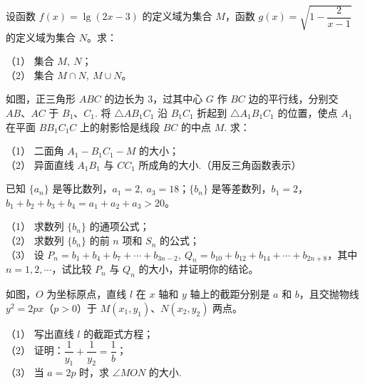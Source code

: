 \begin{question}

设函数 $f(x)=\lg(2x-3)$ 的定义域为集合 $M$，函数 $g(x)=\sqrt{1-\dfrac2{x-1}}$ 的定义域为集合 $N$。求：

（1） 集合 $M,\ N$；\\
（2） 集合 $M\cap N,\ M\cup N$。

\Needspace{0.4\textheight}
\end{question}
\begin{question}

如图，正三角形 $ABC$ 的边长为 $3$，过其中心 $G$ 作 $BC$ 边的平行线，分别交 $AB\text{、}AC$ 于 $B_1\text{、}C_1$. 将 $\triangle AB_1C_1$ 沿 $B_1C_1$ 折起到 $\triangle A_1B_1C_1$ 的位置，使点 $A_1$ 在平面 $BB_1C_1C$ 上的射影恰是线段 $BC$ 的中点 $M$. 求：

（1） 二面角 $A_1-B_1C_1-M$ 的大小；\\
（2） 异面直线 $A_1B_1$ 与 $CC_1$ 所成角的大小.（用反三角函数表示）
\nopagebreak[4]
\begin{center}\end{center}
\nopagebreak[4]
\end{question}
\begin{question}

已知 $\{a_n\}$ 是等比数列，$a_1=2,\ a_3=18$；$\{b_n\}$ 是等差数列，$b_1=2$，$b_1+b_2+b_3+b_4=a_1+a_2+a_3>20$。

（1） 求数列 $\{b_n\}$ 的通项公式；\\
（2） 求数列 $\{b_n\}$ 的前 $n$ 项和 $S_n$ 的公式；\\
（3） 设 $P_n=b_1+b_4+b_7+\cdots+b_{3n-2},\ Q_n=b_{10}+b_{12}+b_{14}+\cdots+b_{2n+8}$，其中 $n=1,2,\cdots$，试比较 $P_n$ 与 $Q_n$ 的大小，并证明你的结论。

\Needspace{0.4\textheight}
\end{question}
\begin{question}

如图，$O$ 为坐标原点，直线 $l$ 在 $x$ 轴和 $y$ 轴上的截距分别是 $a$ 和 $b$，且交抛物线 $y^2=2px$（$p>0$）于 $M(x_1,y_1)\text{、}N(x_2,y_2)$ 两点。

（1） 写出直线 $l$ 的截距式方程；\\
（2） 证明：$\dfrac1{y_1}+\dfrac1{y_2}=\dfrac1b$；\\
（3） 当 $a=2p$ 时，求 $\angle MON$ 的大小.
\nopagebreak[4]
\begin{center}\end{center}
\nopagebreak[4]
\end{question}
